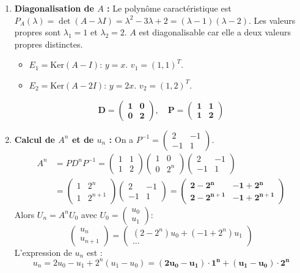 \documentclass[french]{yLectureNote}
\begin{document}
\begin{enumerate}
    \item \textbf{Diagonalisation de $A$ :}
    Le polynôme caractéristique est $P_A(\lambda) = \det(A - \lambda I) = \lambda^2 - 3\lambda + 2 = (\lambda - 1)(\lambda - 2)$.
    Les valeurs propres sont $\lambda_1 = 1$ et $\lambda_2 = 2$. $A$ est diagonalisable car elle a deux valeurs propres distinctes.
    \begin{itemize}
        \item $E_1 = \text{Ker}(A - I)$: $y=x$. $v_1 = (1, 1)^T$.
        \item $E_2 = \text{Ker}(A - 2I)$: $y=2x$. $v_2 = (1, 2)^T$.
    \end{itemize}
    $$\mathbf{D = \begin{pmatrix} 1&0\\ 0&2 \end{pmatrix}, \quad P = \begin{pmatrix} 1&1\\ 1&2 \end{pmatrix}}$$

    \item \textbf{Calcul de $A^{n}$ et de $u_{n}$ :}
    On a $P^{-1} = \begin{pmatrix} 2&-1\\ -1&1 \end{pmatrix}$.
    \begin{align*}
    A^n &= P D^n P^{-1} = \begin{pmatrix} 1&1\\ 1&2 \end{pmatrix} \begin{pmatrix} 1&0\\ 0&2^n \end{pmatrix} \begin{pmatrix} 2&-1\\ -1&1 \end{pmatrix} \\
    &= \begin{pmatrix} 1&2^n\\ 1&2^{n+1} \end{pmatrix} \begin{pmatrix} 2&-1\\ -1&1 \end{pmatrix} = \mathbf{\begin{pmatrix} 2-2^n & -1+2^n \\ 2-2^{n+1} & -1+2^{n+1} \end{pmatrix}}
    \end{align*}
    Alors $U_n = A^n U_0$ avec $U_0 = \begin{pmatrix} u_0 \\ u_1 \end{pmatrix}$:
    $$\begin{pmatrix} u_n \\ u_{n+1} \end{pmatrix} = \begin{pmatrix} (2-2^n)u_0 + (-1+2^n)u_1 \\ \text{...} \end{pmatrix}$$
    L'expression de $u_n$ est :
    $$u_n = 2u_0 - u_1 + 2^n(u_1 - u_0) = \mathbf{(2u_0 - u_1) \cdot 1^n + (u_1 - u_0) \cdot 2^n}$$
\end{enumerate}
\end{document}
